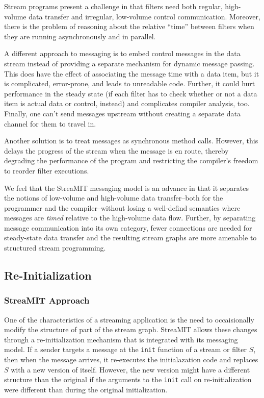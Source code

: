 Stream programs present a challenge in that filters need both regular,
high-volume data transfer and irregular, low-volume control
communication.  Moreover, there is the problem of reasoning about the
relative ``time'' between filters when they are running asynchronously
and in parallel.

A different approach to messaging is to embed control messages in the
data stream instead of providing a separate mechanism for dynamic
message passing.  This does have the effect of associating the message
time with a data item, but it is complicated, error-prone, and leads
to unreadable code.  Further, it could hurt performance in the steady
state (if each filter has to check whether or not a data item is
actual data or control, instead) and complicates compiler analysis,
too.  Finally, one can't send messages upstream without creating a
separate data channel for them to travel in.

Another solution is to treat messages as synchronous method calls.
However, this delays the progress of the stream when the message is en
route, thereby degrading the performance of the program and
restricting the compiler's freedom to reorder filter executions.  

We feel that the StreaMIT messaging model is an advance in that it
separates the notions of low-volume and high-volume data
transfer--both for the programmer and the compiler--without losing a
well-defind semantics where messages are {\it timed} relative to the
high-volume data flow.  Further, by separating message communication
into its own category, fewer connections are needed for steady-state
data transfer and the resulting stream graphs are more amenable to
structured stream programming.

\subsection{Re-Initialization}
\label{sec:reinit}

\subsubsection{StreaMIT Approach}

One of the characteristics of a streaming application is the need to
occaisionally modify the structure of part of the stream graph.
StreaMIT allows these changes through a re-initialization mechanism
that is integrated with its messaging model.  If a sender targets a
message at the {\tt init} function of a stream or filter $S$, then
when the message arrives, it re-executes the initialazation code and
replaces $S$ with a new version of itself.  However, the new version
might have a different structure than the original if the arguments to
the {\tt init} call on re-initialization were different than during
the original initialization.

